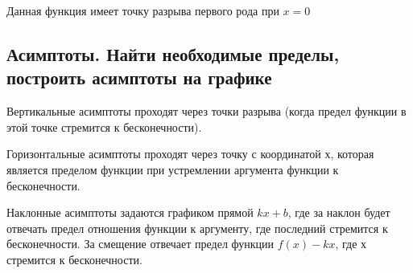 Данная функция имеет точку разрыва первого рода при $x=0$

\subsection{Асимптоты. Найти необходимые пределы, построить асимптоты на графике}

Вертикальные асимптоты проходят через точки разрыва (когда предел функции в этой точке стремится к бесконечности). 

Горизонтальные асимптоты проходят через точку с координатой $х$, которая является пределом функции при устремлении аргумента функции к бесконечности.

Наклонные асимптоты задаются графиком прямой $kx+b$, где за наклон будет отвечать предел отношения функции к аргументу, где последний стремится к бесконечности. За смещение отвечает предел функции $f(x)-kx$, где $х$ стремится к бесконечности.



